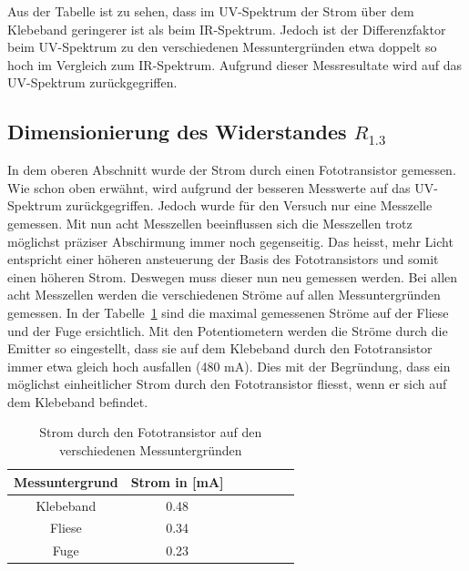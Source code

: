 \documentclass[main.tex]{subfiles} %
\begin{document}
Aus der Tabelle ist zu sehen, dass im UV-Spektrum der Strom über dem Klebeband geringerer ist als beim IR-Spektrum. Jedoch ist der Differenzfaktor beim UV-Spektrum zu den 
verschiedenen Messuntergründen etwa doppelt so hoch im Vergleich zum IR-Spektrum. Aufgrund dieser Messresultate wird auf das UV-Spektrum zurückgegriffen.


\subsection{Dimensionierung des Widerstandes $R_{1.3}$}
In dem oberen Abschnitt wurde der Strom durch einen Fototransistor gemessen. Wie schon oben erwähnt, wird aufgrund der besseren Messwerte auf das UV-Spektrum
zurückgegriffen. Jedoch wurde für den Versuch nur eine Messzelle gemessen. Mit nun acht Messzellen beeinflussen sich die Messzellen trotz möglichst präziser 
Abschirmung immer noch gegenseitig. Das heisst, mehr Licht entspricht einer höheren ansteuerung der Basis des Fototransistors und somit einen höheren Strom. 
Deswegen muss dieser nun neu gemessen werden. Bei allen acht Messzellen werden die verschiedenen Ströme auf allen Messuntergründen gemessen. In der Tabelle~\ref{tab:Strommessungen_alle} sind die maximal
gemessenen Ströme auf der Fliese und der Fuge ersichtlich. Mit den Potentiometern werden die Ströme durch die Emitter so eingestellt, dass sie auf dem Klebeband durch den Fototransistor immer 
etwa gleich hoch ausfallen (480 mA). Dies mit der Begründung, dass ein möglichst einheitlicher Strom durch den Fototransistor fliesst, wenn er sich auf dem Klebeband befindet.

\begin{table}[h]                                    
    \centering
    \begin{tabular}{|c|c|c|c|c|c|c|}                        
        \hline
        \textbf{Messuntergrund} & \textbf{Strom in [mA]}        \\ \hline
        Klebeband               & 0.48                          \\ \hline
        Fliese                  & 0.34                          \\ \hline
        Fuge                    & 0.23                          \\ \hline

        \end{tabular}
\caption{Strom durch den Fototransistor auf den verschiedenen Messuntergründen}
\label{tab:Strommessungen_alle}
\end{table}
\end{document}
